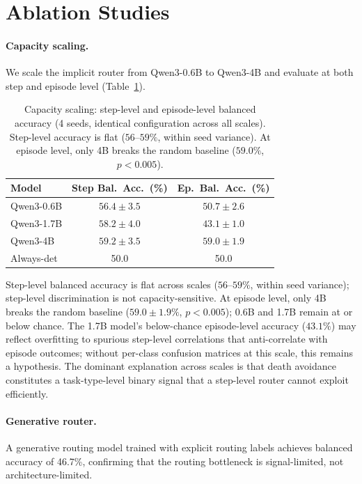 \documentclass[11pt]{article}
\begin{document}
\section{Ablation Studies}
\label{app:ablations}

\paragraph{Capacity scaling.} We scale the implicit router from Qwen3-0.6B to Qwen3-4B and evaluate at both step and episode level (Table~\ref{tab:capacity}).

\begin{table}[h]
\centering
\small
\begin{tabular}{@{}lcc@{}}
\toprule
Model & Step Bal.\ Acc.\ (\%) & Ep.\ Bal.\ Acc.\ (\%) \\
\midrule
Qwen3-0.6B & $56.4 \pm 3.5$ & $50.7 \pm 2.6$ \\
Qwen3-1.7B & $58.2 \pm 4.0$ & $43.1 \pm 1.0$ \\
Qwen3-4B & $59.2 \pm 3.5$ & $\mathbf{59.0 \pm 1.9}$ \\
\midrule
Always-det & 50.0 & 50.0 \\
\bottomrule
\end{tabular}
\caption{Capacity scaling: step-level and episode-level balanced accuracy (4 seeds, identical configuration across all scales). Step-level accuracy is flat ($56$--$59\%$, within seed variance). At episode level, only 4B breaks the random baseline ($59.0\%$, $p < 0.005$).}
\label{tab:capacity}
\end{table}

Step-level balanced accuracy is flat across scales ($56$--$59\%$, within seed variance); step-level discrimination is not capacity-sensitive. At episode level, only 4B breaks the random baseline ($59.0 \pm 1.9\%$, $p < 0.005$); 0.6B and 1.7B remain at or below chance. The 1.7B model's below-chance episode-level accuracy ($43.1\%$) may reflect overfitting to spurious step-level correlations that anti-correlate with episode outcomes; without per-class confusion matrices at this scale, this remains a hypothesis. The dominant explanation across scales is that death avoidance constitutes a task-type-level binary signal that a step-level router cannot exploit efficiently.

\paragraph{Generative router.} A generative routing model trained with explicit routing labels achieves balanced accuracy of 46.7\%, confirming that the routing bottleneck is signal-limited, not architecture-limited.
\end{document}

